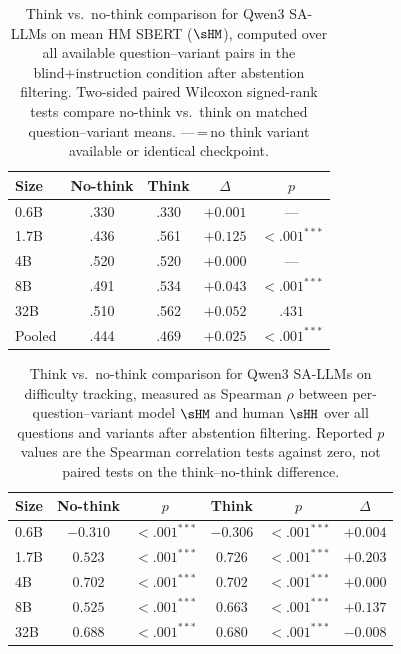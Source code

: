 \begin{table}[h]
\centering
\small
\setlength{\tabcolsep}{4pt}
\caption{Think vs.\ no-think comparison for Qwen3 SA-LLMs on mean HM SBERT ($\sHM$), computed over all available question--variant pairs in the blind+instruction condition after abstention filtering. Two-sided paired Wilcoxon signed-rank tests compare no-think vs.\ think on matched question--variant means. {---}\,=\,no think variant available or identical checkpoint.}
\label{tab:thinking_shm_wilcoxon}
\begin{tabular}{lcccc}
\toprule
\textbf{Size} & \textbf{No-think} & \textbf{Think} & \textbf{$\Delta$} & \textbf{$p$} \\
\midrule
0.6B  & .330 & .330 & $+0.001$ & {---} \\
1.7B  & .436 & .561 & $+0.125$ & $<.001^{***}$ \\
4B    & .520 & .520 & $+0.000$ & {---} \\
8B    & .491 & .534 & $+0.043$ & $<.001^{***}$ \\
32B   & .510 & .562 & $+0.052$ & $.431$ \\
\midrule
Pooled & .444 & .469 & $+0.025$ & $<.001^{***}$ \\
\bottomrule
\end{tabular}
\end{table}

\begin{table}[h]
\centering
\small
\setlength{\tabcolsep}{4pt}
\caption{Think vs.\ no-think comparison for Qwen3 SA-LLMs on difficulty tracking, measured as Spearman $\rho$ between per-question--variant model $\sHM$ and human $\sHH$ over all questions and variants after abstention filtering. Reported $p$ values are the Spearman correlation tests against zero, not paired tests on the think--no-think difference.}
\label{tab:thinking_spearman}
\begin{tabular}{lccccc}
\toprule
\textbf{Size} & \textbf{No-think} & \textbf{$p$} & \textbf{Think} & \textbf{$p$} & \textbf{$\Delta$} \\
\midrule
0.6B  & $-0.310$ & $<.001^{***}$ & $-0.306$ & $<.001^{***}$ & $+0.004$ \\
1.7B  & $0.523$ & $<.001^{***}$ & $0.726$ & $<.001^{***}$ & $+0.203$ \\
4B    & $0.702$ & $<.001^{***}$ & $0.702$ & $<.001^{***}$ & $+0.000$ \\
8B    & $0.525$ & $<.001^{***}$ & $0.663$ & $<.001^{***}$ & $+0.137$ \\
32B   & $0.688$ & $<.001^{***}$ & $0.680$ & $<.001^{***}$ & $-0.008$ \\
\bottomrule
\end{tabular}
\end{table}
